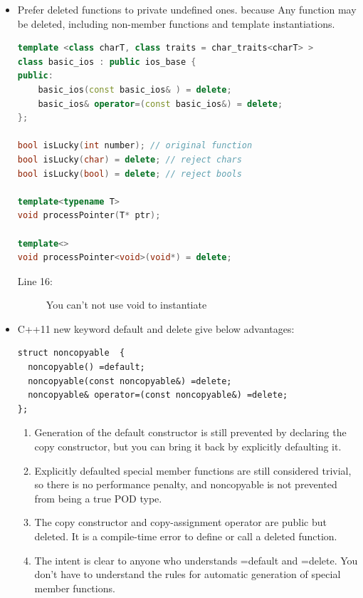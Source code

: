 \documentclass[a4paper,11pt,twoside]{book}
\begin{document}
\begin{itemize}
    \item Prefer deleted functions to private undefined ones. because Any function may be deleted, including non-member functions and template instantiations.

\begin{lstlisting}[frame=single, language=c++]
template <class charT, class traits = char_traits<charT> >
class basic_ios : public ios_base {
public:
	basic_ios(const basic_ios& ) = delete;
	basic_ios& operator=(const basic_ios&) = delete;
};

bool isLucky(int number); // original function
bool isLucky(char) = delete; // reject chars
bool isLucky(bool) = delete; // reject bools

template<typename T>
void processPointer(T* ptr);

template<>
void processPointer<void>(void*) = delete;
\end{lstlisting} 
\begin{description}
	\item[Line 16:] You can't not use void to instantiate
\end{description}

\item C++11 new keyword default and delete give below advantages:
\begin{lstlisting}[numbers=none]
struct noncopyable  {
  noncopyable() =default;
  noncopyable(const noncopyable&) =delete;
  noncopyable& operator=(const noncopyable&) =delete;
};
\end{lstlisting}

\begin{enumerate}
	\item Generation of the default constructor is still prevented by declaring the copy constructor, but you can bring it back by explicitly defaulting it.

	\item Explicitly defaulted special member functions are still considered trivial, so there is no performance penalty, and noncopyable is not prevented from being a true POD type.

	\item The copy constructor and copy-assignment operator are public but deleted. It is a compile-time error to define or call a deleted function.

	\item The intent is clear to anyone who understands =default and =delete. You don't have to understand the rules for automatic generation of special member functions.
\end{enumerate}


\end{itemize}
\end{document}
